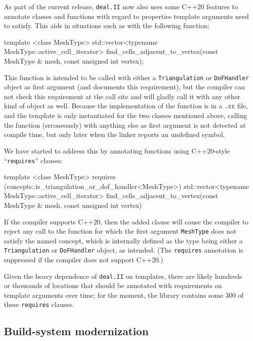 \documentclass{ansarticle-preprint}
\newcommand{\specialword}[1]{\texttt{#1}}
\newcommand{\dealii}{{\specialword{deal.II}}\xspace}
\begin{document}
As part of the current release, \dealii{} now also uses some C++20
features to annotate classes and functions with regard to properties
template arguments need to satisfy. This aids in situations such as
with the
following function:
\begin{c++}
  template <class MeshType>
  std::vector<typename MeshType::active_cell_iterator>
  find_cells_adjacent_to_vertex(const MeshType &   mesh,
                                const unsigned int vertex);
\end{c++}
This function is intended to be called with either a
\texttt{Triangulation} or \texttt{DoFHandler} object as first
argument (and documents this requirement), but the compiler can not check this requirement at the call
site and will gladly call it with any other kind of object as
well. Because the implementation of the function is in a \texttt{.cc}
file, and the template is only instantiated for the two classes
mentioned above, calling the function (erroneously) with anything else
as first argument is not detected at compile time, but only later when
the linker reports an undefined symbol.

We have started to address this by annotating functions using
C++20-style ``\texttt{requires}'' clauses:
\begin{c++}
  template <class MeshType>
    requires (concepts::is_triangulation_or_dof_handler<MeshType>)
  std::vector<typename MeshType::active_cell_iterator>
  find_cells_adjacent_to_vertex(const MeshType &   mesh,
                                const unsigned int vertex)
\end{c++}
If the compiler supports C++20, then the added clause will cause the
compiler to reject any call to the function for which the first
argument \texttt{MeshType} does not satisfy the named concept, which
is internally defined as the type being either a \texttt{Triangulation} or \texttt{DoFHandler}
object, as intended. (The \texttt{requires} annotation is suppressed if the compiler
does not support C++20.)

Given the heavy dependence of \dealii{} on templates, there are likely
hundreds or thousands of locations that should be annotated with
requirements on template arguments over time; for the moment, the
library contains some 300 of these \texttt{requires} clauses.


\subsection{Build-system modernization}\label{sec:buildsystem}
\end{document}
